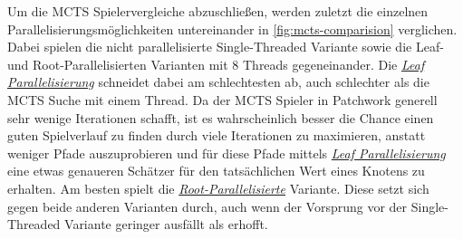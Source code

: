 \pagebreak

Um die \ac{MCTS} Spielervergleiche abzuschließen, werden zuletzt die einzelnen Parallelisierungsmöglichkeiten untereinander in \ref{fig:mcts-comparision} verglichen. Dabei spielen die nicht parallelisierte Single-Threaded Variante sowie die Leaf- und Root-Parallelisierten Varianten mit 8 Threads gegeneinander. Die \hyperref[text:leaf-parallelization]{\emph{Leaf Parallelisierung}} schneidet dabei am schlechtesten ab, auch schlechter als die \ac{MCTS} Suche mit einem Thread. Da der \ac{MCTS} Spieler in Patchwork generell sehr wenige Iterationen schafft, ist es wahrscheinlich besser die Chance einen guten Spielverlauf zu finden durch viele Iterationen zu maximieren, anstatt weniger Pfade auszuprobieren und für diese Pfade mittels \hyperref[text:leaf-parallelization]{\emph{Leaf Parallelisierung}} eine etwas genaueren Schätzer für den tatsächlichen Wert eines Knotens zu erhalten. Am besten spielt die \hyperref[text:root-parallelization]{\emph{Root-Parallelisierte}} Variante. Diese setzt sich gegen beide anderen Varianten durch, auch wenn der Vorsprung vor der Single-Threaded Variante geringer ausfällt als erhofft.

